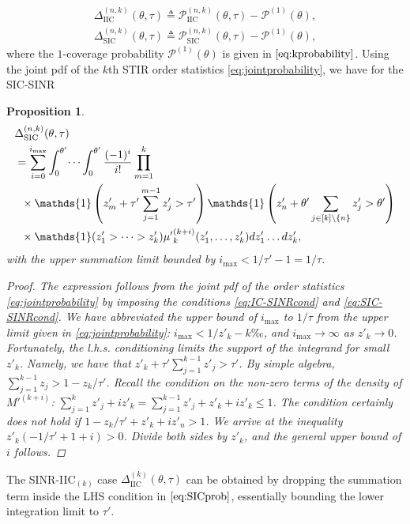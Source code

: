 \documentclass[lettersize,journal]{IEEEtran}
\newtheorem{prop}[theorem]{Proposition}
\begin{document}
\begin{align}
  \label{DeltSICIIC}
  \Delta^{(n,k)}_{\text{IIC}}(\theta,\tau) \triangleq \mathcal{P}^{(n,k)}_{\text{IIC}}(\theta,\tau)- \mathcal{P}^{(1)}(\theta),\nonumber\\
  \Delta^{(n,k)}_{\text{SIC}}(\theta,\tau) \triangleq \mathcal{P}^{(n,k)}_{\text{SIC}}(\theta,\tau)- \mathcal{P}^{(1)}(\theta),
\end{align}
where the $1$-coverage probability  $\mathcal{P}^{(1)}(\theta)$ is given in $\eqref{eq:kprobability}$. Using the joint pdf of the $k$th STIR order statistics \eqref{eq:jointprobability}, we have for the SIC-SINR
\begin{prop}
  \begin{align}
    \label{eq:SICprob}
    & \Delta^{(n,k)}_{\text{SIC}}(\theta,\tau) \nonumber\\
    &=\sum^{i_{\text{max}}}_{i=0} \int_{0}^{\theta'} \dots \int_{0}^{\theta'}\frac{(-1)^i}{i!}\prod_{m=1}^k\nonumber \\
    &\hspace{0.2cm}\times \mathds{1}\left( z'_m+ \tau'\sum_{j=1}^{m-1} z'_j>\tau' \right)  \mathds{1}\left(z'_n+  \theta'\sum_{j\in [k] \setminus \{n\}} z'_j>\theta' \right) \nonumber \\
    & \hspace{0.2cm}\times \mathds{1}(z'_1>\dots>z'_k){\mu'}_k^{(k+i)}(z'_1,\dots,z'_k) d z'_1 \dots d z'_k,
  \end{align}
  with the upper summation limit bounded by $i_{\text{max}} < 1/\tau'-1=1/\tau.$ 
  \begin{proof}
    The expression follows from the joint pdf of the order statistics \eqref{eq:jointprobability} by imposing the conditions \eqref{eq:IC-SINRcond} and \eqref{eq:SIC-SINRcond}. We have abbreviated the upper bound of $i_{\text{max}}$ to $1/\tau$ from the upper limit given in \eqref{eq:jointprobability}: $i_{\text{max}} < 1/z'_{k}-k‰$, and $i_{\text{max}} \rightarrow \infty$ as $z'_k \rightarrow 0$. Fortunately, the l.h.s. conditioning limits the support of the integrand for small $z'_k$. Namely, we have that $z'_{k}+\tau'\sum_{j=1}^{k-1}z'_{j}>\tau'$. By simple algebra, $\sum_{j=1}^{k-1}z_{j}> 1-z_{k}/\tau'$. Recall the condition on the non-zero terms of the density of $M'^{(k+i)}$:  $\sum_{j=1}^k z'_{j}+i z'_{k} =\sum_{j=1}^{k-1}z'_{j} +z'_{k}+i z'_{k}  \leq 1$. The condition certainly does \textit{not} hold if $1-z_{k}/\tau'+ z'_{k}+i z'_{n}>1$. We arrive at the inequality $z'_{k} \left(-1/\tau' + 1 +i \right)>0$. Divide both sides by $z'_{k}$, and the general upper bound of $i$ follows.




  \end{proof}
\end{prop}
The SINR-IIC$_{(k)}$ case $\Delta^{(k)}_{\text{IIC}}(\theta,\tau)$ can be obtained by dropping the summation term inside the LHS condition in $\eqref{eq:SICprob}$, essentially bounding the lower integration limit to $\tau'$.
\end{document}
